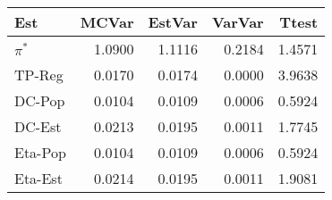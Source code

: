 
\begin{tabular}{lrrrr}
\toprule
Est & MCVar & EstVar & VarVar & Ttest\\
\midrule
$\pi^*$ & 1.0900 & 1.1116 & 0.2184 & 1.4571\\
TP-Reg & 0.0170 & 0.0174 & 0.0000 & 3.9638\\
DC-Pop & 0.0104 & 0.0109 & 0.0006 & 0.5924\\
DC-Est & 0.0213 & 0.0195 & 0.0011 & 1.7745\\
Eta-Pop & 0.0104 & 0.0109 & 0.0006 & 0.5924\\
\addlinespace
Eta-Est & 0.0214 & 0.0195 & 0.0011 & 1.9081\\
\bottomrule
\end{tabular}